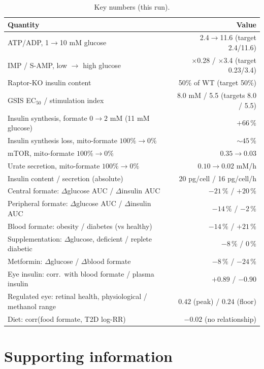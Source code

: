 \documentclass[10pt,letterpaper]{article}
\begin{document}
\begin{table}[h]
  \centering
  \small
  \caption{Key numbers (this run).}
  \begin{tabular}{@{}lr@{}}
    \toprule
    Quantity & Value \\
    \midrule
    ATP/ADP, 1$\rightarrow$10 mM glucose~\cite{detimary1998} & 2.4$\rightarrow$11.6 (target 2.4/11.6) \\
    IMP / S-AMP, low $\rightarrow$ high glucose~\cite{gooding2015} & $\times$0.28 / $\times$3.4 (target 0.23/3.4) \\
    Raptor-KO insulin content~\cite{ni2017} & 50\% of WT (target 50\%) \\
    GSIS EC$_{50}$ / stimulation index & 8.0 mM / 5.5 (targets 8.0 / 5.5) \\
    Insulin synthesis, formate $0\rightarrow2$ mM (11 mM glucose) & $+66\,\%$ \\
    Insulin synthesis loss, mito-formate $100\%\rightarrow0\%$ & ${\sim}45\,\%$ \\
    mTOR, mito-formate $100\%\rightarrow0\%$ & $0.35\rightarrow0.03$ \\
    Urate secretion, mito-formate $100\%\rightarrow0\%$ & $0.10\rightarrow0.02$ mM/h \\
    Insulin content / secretion (absolute) & 20 pg/cell / 16 pg/cell/h \\
    Central formate: $\Delta$glucose AUC / $\Delta$insulin AUC & $-21\,\%$ / $+20\,\%$ \\
    Peripheral formate: $\Delta$glucose AUC / $\Delta$insulin AUC & $-14\,\%$ / $-2\,\%$ \\
    Blood formate: obesity / diabetes (vs healthy) & $-14\,\%$ / $+21\,\%$ \\
    Supplementation: $\Delta$glucose, deficient / replete diabetic & $-8\,\%$ / $0\,\%$ \\
    Metformin: $\Delta$glucose / $\Delta$blood formate & $-8\,\%$ / $-24\,\%$ \\
    Eye insulin: corr.\ with blood formate / plasma insulin & $+0.89$ / $-0.90$ \\
    Regulated eye: retinal health, physiological / methanol range & $0.42$ (peak) / $0.24$ (floor) \\
    Diet: corr(food formate, T2D log-RR) & $-0.02$ (no relationship) \\
    \bottomrule
  \end{tabular}
\end{table}
\section*{Supporting information}
\end{document}
